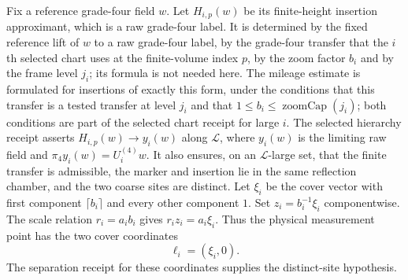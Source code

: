 Fix a reference grade-four field $w$. Let $H_{i,p}(w)$ be its finite-height
insertion approximant, which is a raw grade-four label. It is determined
by the fixed reference lift of $w$ to a raw grade-four label, by the
grade-four transfer that the $i$th selected chart uses at the
finite-volume index $p$, by the zoom factor $b_i$ and by the frame level
$j_i$; its formula is not needed here. The mileage estimate is formulated
for insertions of exactly this form, under the conditions that this
transfer is a tested transfer at level $j_i$ and that
$1\le b_i\le\operatorname{zoomCap}(j_i)$; both conditions are part of the
selected chart receipt for large $i$. The selected
hierarchy receipt asserts $H_{i,p}(w)\to y_i(w)$ along $\mathcal L$, where
$y_i(w)$ is the limiting raw field and $\pi_4 y_i(w)=U_i^{(4)}w$. It also
ensures, on an
$\mathcal L$-large set, that the finite transfer is admissible, the marker
and insertion lie in the same reflection chamber, and the two coarse sites
are distinct. Let $\xi_i$ be the cover vector with first component $\lceil b_i\rceil$
and every other component $1$. Set $z_i=b_i^{-1}\xi_i$ componentwise.
The scale relation $r_i=a_i b_i$ gives $r_i z_i=a_i\xi_i$. Thus the
physical measurement point has the two cover coordinates
\[
 \ell_i=(\xi_i,0).
\]
The separation receipt for these coordinates supplies the distinct-site
hypothesis.

